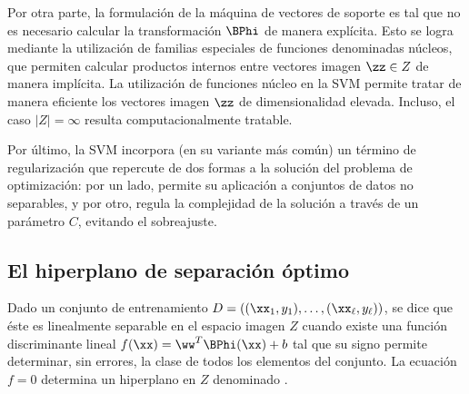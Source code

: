Por otra parte, la formulación de la máquina de vectores de soporte
es tal que no es necesario
calcular la transformación $\BPhi$ de manera explícita. Esto se logra
mediante la utilización de familias especiales de funciones
denominadas núcleos, que permiten calcular productos internos entre
vectores imagen $\zz\in{}Z$ de manera implícita.  La utilización de
funciones núcleo en la SVM permite tratar de manera eficiente los
vectores imagen $\zz$ de dimensionalidad elevada.  Incluso, el caso
$|Z|=\infty$ resulta computacionalmente tratable.

Por último, la SVM incorpora (en su variante más común) un término de
regularización que repercute de dos formas a la solución del problema
de optimización: por un lado, permite su aplicación a conjuntos de
datos no separables, y por otro, regula la complejidad de la solución
a través de un parámetro $C$, evitando el sobreajuste.
%
%
\subsection{El hiperplano de separación óptimo}
%
Dado un conjunto de entrenamiento
$D=\left((\xx_1,y_1),\ldots,(\xx_\ell,y_\ell)\right)$, se dice que
éste es linealmente separable en el espacio imagen $Z$ cuando existe
una función discriminante lineal $f(\xx)=\ww^T\BPhi(\xx)+b$ tal
que su signo permite determinar, sin errores, la clase de todos los
elementos del conjunto. La ecuación $f=0$ determina un
hiperplano en $Z$ denominado .

